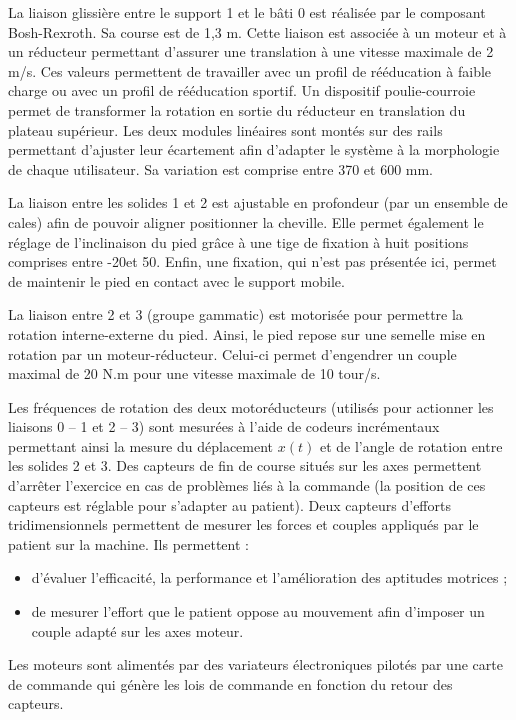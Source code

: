 \documentclass[10pt]{article}
\begin{document}
La liaison glissière entre le support 1 et le bâti 0 est réalisée par le composant Bosh-Rexroth. Sa course est de 1,3 m. Cette liaison est associée à un moteur et à un réducteur permettant d’assurer une translation à une vitesse maximale de 2 m/s. Ces valeurs permettent de travailler avec un profil de rééducation à faible charge ou avec un profil de rééducation sportif. Un dispositif poulie-courroie permet de transformer la rotation en sortie du réducteur en translation du plateau supérieur. Les deux modules linéaires sont montés sur des rails permettant d’ajuster leur écartement afin d’adapter le système à la morphologie de chaque utilisateur. Sa variation est comprise entre 370 et 600 mm.

La liaison entre les solides 1 et 2 est ajustable en profondeur (par un ensemble de cales) afin de pouvoir aligner positionner la cheville. Elle permet également le réglage de l’inclinaison du pied grâce à une tige de fixation à huit positions comprises entre -20\textdegree et 50\textdegree. Enfin, une fixation, qui n’est pas présentée ici, permet de maintenir le pied en contact avec le support mobile.

La liaison entre 2 et 3 (groupe gammatic) est motorisée pour permettre la rotation interne-externe du pied. Ainsi, le pied repose sur une semelle mise en rotation par un moteur-réducteur. Celui-ci permet d’engendrer un couple maximal de 20 N.m pour une vitesse maximale de 10 tour/s. 

Les fréquences de rotation des deux motoréducteurs (utilisés pour actionner les liaisons 0 – 1 et 2 – 3) sont mesurées à l'aide de codeurs incrémentaux permettant ainsi la mesure du déplacement $x(t)$ et de l’angle de rotation entre les solides 2 et 3. Des capteurs de fin de course situés sur les axes permettent d'arrêter l'exercice en cas de problèmes liés à la commande (la position de ces capteurs est réglable pour s'adapter au patient). Deux capteurs d'efforts tridimensionnels permettent de mesurer les forces et couples appliqués par le patient sur la machine. Ils permettent :
\begin{itemize}
\item d'évaluer l'efficacité, la performance et l'amélioration des aptitudes motrices ;
\item de mesurer l'effort que le patient oppose au mouvement afin d'imposer un couple adapté sur les axes moteur.
\end{itemize}
Les moteurs sont alimentés par des variateurs électroniques pilotés par une carte de commande qui génère les lois de commande en fonction du retour des capteurs.
\end{document}
